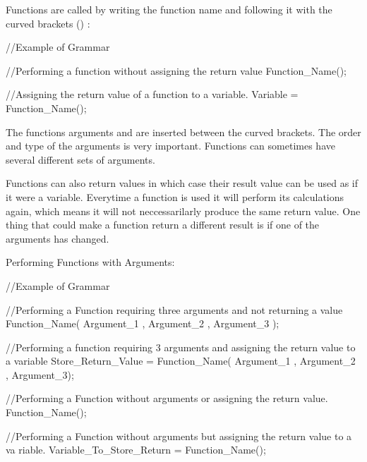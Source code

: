  Functions are called by writing the function name and following it with the curved brackets () : 
\begin{DoxyCode}
 //Example of Grammar

 //Performing a function without assigning the return value
 Function_Name();

 //Assigning the return value of a function to a variable.
 Variable = Function_Name();
\end{DoxyCode}
 The functions arguments and are inserted between the curved brackets. The order and type of the arguments is very important. Functions can sometimes have several different sets of arguments. \par
 Functions can also return values in which case their result value can be used as if it were a variable. Everytime a function is used it will perform its calculations again, which means it will not neccessarilarly produce the same return value. One thing that could make a function return a different result is if one of the arguments has changed. \par


Performing Functions with Arguments: 
\begin{DoxyCode}
 //Example of Grammar

 //Performing a Function requiring three arguments and not returning a value
 Function_Name( Argument_1 , Argument_2 , Argument_3 );

 //Performing a function requiring 3 arguments and assigning the return value to 
      a variable
 Store_Return_Value = Function_Name( Argument_1 , Argument_2 , Argument_3);

 //Performing a Function without arguments or assigning the return value.
 Function_Name();

 //Performing a Function without arguments but assigning the return value to a va
      riable.
 Variable_To_Store_Return = Function_Name();
\end{DoxyCode}



